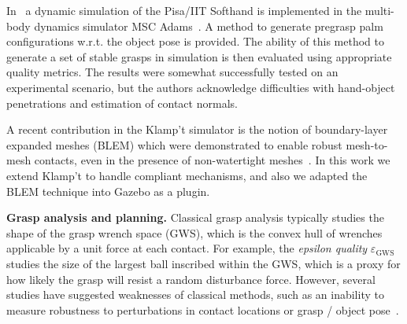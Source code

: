 In~\cite{Bonilla14} a dynamic simulation of the Pisa/IIT Softhand is implemented in the multi-body dynamics simulator MSC Adams~\cite{MSCAdams}. A method to generate pregrasp palm configurations w.r.t. the object pose is provided. The ability of this method to generate a set of stable grasps in simulation is then evaluated using  appropriate quality metrics. The results were somewhat successfully tested on an experimental scenario, but the authors acknowledge difficulties with hand-object penetrations and estimation of contact normals.

 A recent contribution in the Klamp't simulator is the notion of boundary-layer expanded meshes (BLEM) which were demonstrated to enable robust mesh-to-mesh contacts, even in the presence of non-watertight meshes~\cite{Hauser13BLEM}. In this work we extend Klamp't to handle compliant mechanisms, and also we adapted the BLEM technique into Gazebo as a plugin.


{\bf Grasp analysis and planning.}  
Classical grasp analysis typically studies the shape of the grasp wrench space (GWS), which is the convex hull of wrenches applicable by a unit force at each contact. For example, the {\emph{epsilon quality} $\varepsilon_{\text{GWS}}$} \cite{Ferrari92, Pokorny13c} studies the size of the largest ball inscribed within the GWS, which is a proxy for how likely the grasp will resist a random  disturbance force. 
However, several studies have suggested weaknesses of classical methods, such as an inability to measure robustness to perturbations in contact locations or grasp / object pose~\cite{Weisz12}. 


